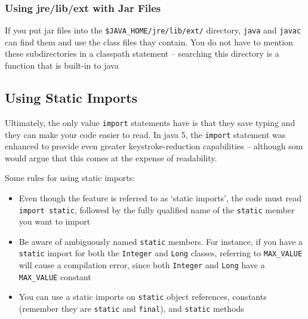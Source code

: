 \subsubsection{Using jre/lib/ext with Jar Files}
If you put jar files into the \verb#$JAVA_HOME/jre/lib/ext/# directory, 
\verb#java# and \verb#javac# can find them and use the class files thay 
contain. You do not have to mention these subdirectories in a classpath 
statement -- searching this directory is a function that is built-in to java

\subsection{Using Static Imports}
Ultimately, the only value \verb#import# statements have is that they save 
typing and they can make your code easier to read. In java 5, the \verb#import# 
statement was enhanced to provide even greater keystroke-reduction capabilities 
-- although som would argue that this comes at the expense of readability.

Some rules for using static imports:
\begin{itemize}
    \item Even though the feature is referred to as `static imports', the code 
    must read \verb#import static#, followed by the fully qualified name of the 
    \verb#static# member you want to import
    \item Be aware of ambiguously named \verb#static# members. For instance, if 
    you have a \verb#static# import for both the \verb#Integer# and \verb#Long# 
    classes, referring to \verb#MAX_VALUE# will cause a compilation error, 
    since both \verb#Integer# and \verb#Long# have a \verb#MAX_VALUE# constant
    \item You can use a static imports on \verb#static# object references, 
    constants (remember they are \verb#static# and \verb#final#), and 
    \verb#static# methods
\end{itemize}
